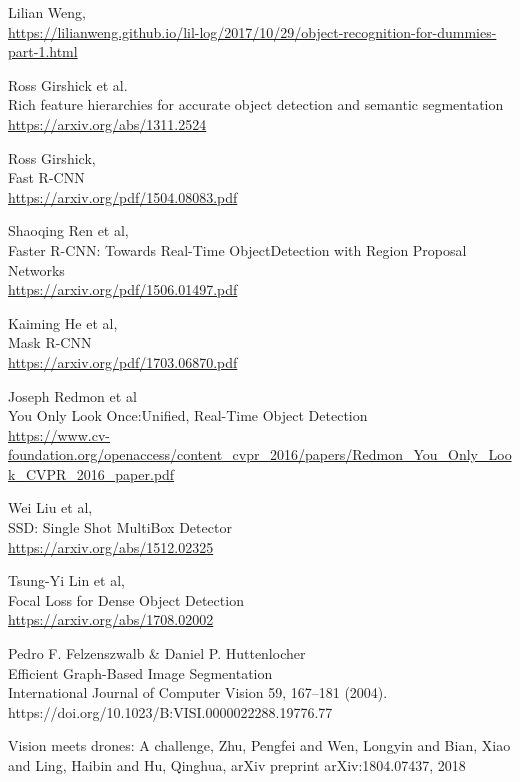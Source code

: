 \documentclass{article}
\begin{document}
\begin{thebibliography}{}
  Lilian Weng,\\
\url{https://lilianweng.github.io/lil-log/2017/10/29/object-recognition-for-dummies-part-1.html}

 Ross Girshick et al. \\
Rich feature hierarchies for accurate object detection and semantic segmentation\\
\url{https://arxiv.org/abs/1311.2524}

 Ross Girshick, \\
Fast R-CNN \\
\url{https://arxiv.org/pdf/1504.08083.pdf}

 Shaoqing Ren et al, \\
Faster R-CNN: Towards Real-Time ObjectDetection with Region Proposal Networks \\
\url{https://arxiv.org/pdf/1506.01497.pdf}

 Kaiming He et al,\\
Mask R-CNN\\
\url{https://arxiv.org/pdf/1703.06870.pdf}

 Joseph Redmon et al\\
You Only Look Once:Unified, Real-Time Object Detection \\
\url{https://www.cv-foundation.org/openaccess/content_cvpr_2016/papers/Redmon_You_Only_Look_CVPR_2016_paper.pdf}

 Wei Liu et al,\\
SSD: Single Shot MultiBox Detector\\
\url{https://arxiv.org/abs/1512.02325}

 Tsung-Yi Lin et al, \\
Focal Loss for Dense Object Detection\\
\url{https://arxiv.org/abs/1708.02002}

 Pedro F. Felzenszwalb \& Daniel P. Huttenlocher \\
Efficient Graph-Based Image Segmentation \\
International Journal of Computer Vision 59, 167–181 (2004). https://doi.org/10.1023/B:VISI.0000022288.19776.77

 Vision meets drones: A challenge, Zhu, Pengfei and Wen, Longyin and Bian, Xiao and Ling, Haibin and Hu, Qinghua, arXiv preprint arXiv:1804.07437, 2018


\end{thebibliography}
\end{document}
